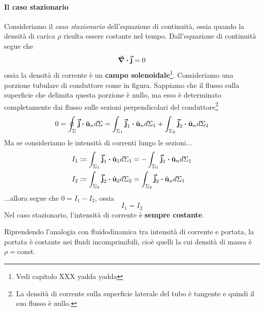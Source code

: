 \paragraph{Il caso stazionario}
	Consideriamo il \textit{caso stazionario} dell'equazione di continuità, ossia quando la densità di carica $\rho$ risulta essere costante nel tempo. Dall'equazione di continuità segue  che
	\begin{equation*}
		\div{\vb*{\va{j}}}=0
	\end{equation*}
	ossia la densità di corrente è un \textbf{campo solenoidale}\footnote{Vedi capitolo XXX yadda yadda}. Consideriamo una porzione tubulare di conduttore come in figura.
	Sappiamo che il flusso sulla superficie che delimita questa porzione è nullo, ma esso è determinato completamente dai flusso sulle sezioni perpendicolari del conduttore\footnote{La densità di corrente sulla superficie laterale del tubo è tangente e quindi il suo flusso è nullo.}
	\begin{equation*}
		0=\oint_{\Sigma}\vba{j}\vdot\vbh{u}_nd\Sigma=\int_{\Sigma_1}\vba{j}_1\vdot\vbh{u}_nd\Sigma_1+\int_{\Sigma_2}\vba{j}_2\vdot\vbh{u}_nd\Sigma_2
	\end{equation*}
	Ma se consideriamo le intensità di correnti lungo le sezioni...
	\begin{align*}
		I_1&\coloneqq\int_{\Sigma_1}\vba{j}_1\vdot\vbh{u}_1d\Sigma_1=-\int_{\Sigma_1}\vba{j}_1\vdot\vbh{u}_nd\Sigma_1\\
		I_2&\coloneqq\int_{\Sigma_2}\vba{j}_2\vdot\vbh{u}_2d\Sigma_2=\int_{\Sigma_2}\vba{j}_2\vdot\vbh{u}_nd\Sigma_1
	\end{align*}
	...allora segue che $0=I_1-I_2$, ossia
	\begin{equation}
		I_1=I_2
	\end{equation}
Nel caso stazionario, l'intensità di corrente è \textbf{sempre costante}.

Riprendendo l'analogia con fluidodinamica tra intensità di corrente e portata, la portata è costante nei fluidi incomprimibili, cioè quelli la cui densità di massa è $\rho=\mathrm{const}$.
